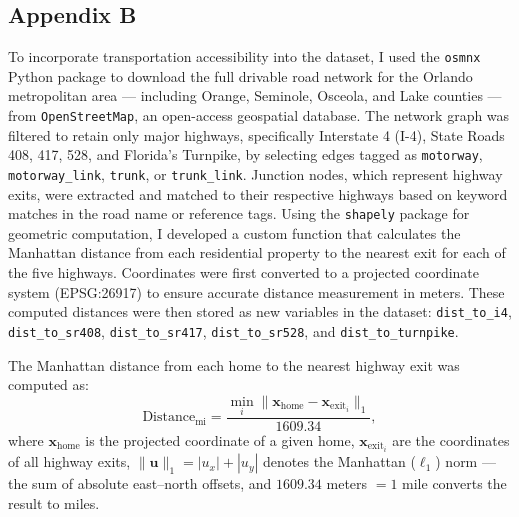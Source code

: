 \subsection*{Appendix B}

To incorporate transportation accessibility into the dataset, I used the \texttt{osmnx} Python package to download the full drivable road network for the Orlando metropolitan area --- including Orange, Seminole, Osceola, and Lake counties --- from \texttt{OpenStreetMap}, an open-access geospatial database. The network graph was filtered to retain only major highways, specifically Interstate 4 (I-4), State Roads 408, 417, 528, and Florida’s Turnpike, by selecting edges tagged as \texttt{motorway}, \texttt{motorway\_link}, \texttt{trunk}, or \texttt{trunk\_link}. Junction nodes, which represent highway exits, were extracted and matched to their respective highways based on keyword matches in the road name or reference tags. Using the \texttt{shapely} package for geometric computation, I developed a custom function that calculates the Manhattan distance from each residential property to the nearest exit for each of the five highways. Coordinates were first converted to a projected coordinate system (EPSG:26917) to ensure accurate distance measurement in meters. These computed distances were then stored as new variables in the dataset: \texttt{dist\_to\_i4}, \texttt{dist\_to\_sr408}, \texttt{dist\_to\_sr417}, \texttt{dist\_to\_sr528}, and \texttt{dist\_to\_turnpike}.

The Manhattan distance from each home to the nearest highway exit was computed as:
\[
\text{Distance}_{\text{mi}}
   = \frac{\displaystyle\min_i 
            \bigl\lVert \mathbf{x}_{\text{home}} 
                   - \mathbf{x}_{\text{exit}_i} \bigr\rVert_1}{1609.34},
\]
\noindent where $\mathbf{x}_{\text{home}}$ is the projected coordinate of a given home,  $\mathbf{x}_{\text{exit}_i}$ are the coordinates of all highway exits, $\lVert\mathbf{u}\rVert_1 
 = |u_x| + |u_y|$ denotes the Manhattan ($\ell_1$) norm --- the sum of absolute east–north offsets, and $1609.34$ meters \(= 1\) mile converts the result to miles.

